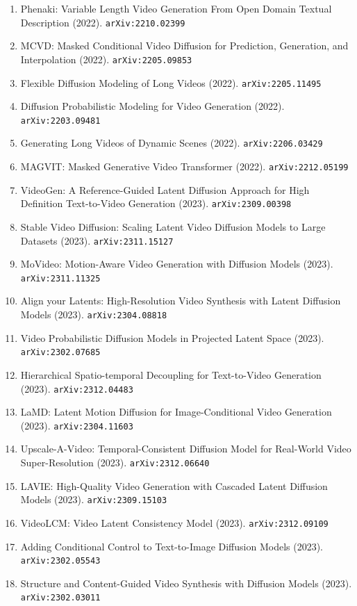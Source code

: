 \documentclass[11pt]{article}
\begin{document}
\begin{enumerate}
  Translation (2022). \texttt{arXiv:2211.12572}
  \item Phenaki: Variable Length Video Generation From Open Domain Textual
  Description (2022). \texttt{arXiv:2210.02399}
  \item MCVD: Masked Conditional Video Diffusion for Prediction, Generation, and
  Interpolation (2022). \texttt{arXiv:2205.09853}
  \item Flexible Diffusion Modeling of Long Videos (2022). \texttt{arXiv:2205.11495}
  \item Diffusion Probabilistic Modeling for Video Generation (2022). \texttt{arXiv:2203.09481}
  \item Generating Long Videos of Dynamic Scenes (2022). \texttt{arXiv:2206.03429}
  \item MAGVIT: Masked Generative Video Transformer (2022). \texttt{arXiv:2212.05199}
  \item VideoGen: A Reference-Guided Latent Diffusion Approach for High
  Definition Text-to-Video Generation (2023). \texttt{arXiv:2309.00398}
  \item Stable Video Diffusion: Scaling Latent Video Diffusion Models to Large
  Datasets (2023). \texttt{arXiv:2311.15127}
  \item MoVideo: Motion-Aware Video Generation with Diffusion Models (2023). \texttt{arXiv:2311.11325}
  \item Align your Latents: High-Resolution Video Synthesis with Latent
  Diffusion Models (2023). \texttt{arXiv:2304.08818}
  \item Video Probabilistic Diffusion Models in Projected Latent Space (2023). \texttt{arXiv:2302.07685}
  \item Hierarchical Spatio-temporal Decoupling for Text-to-Video Generation (2023). \texttt{arXiv:2312.04483}
  \item LaMD: Latent Motion Diffusion for Image-Conditional Video Generation (2023). \texttt{arXiv:2304.11603}
  \item Upscale-A-Video: Temporal-Consistent Diffusion Model for Real-World
  Video Super-Resolution (2023). \texttt{arXiv:2312.06640}
  \item LAVIE: High-Quality Video Generation with Cascaded Latent Diffusion
  Models (2023). \texttt{arXiv:2309.15103}
  \item VideoLCM: Video Latent Consistency Model (2023). \texttt{arXiv:2312.09109}
  \item Adding Conditional Control to Text-to-Image Diffusion Models (2023). \texttt{arXiv:2302.05543}
  \item Structure and Content-Guided Video Synthesis with Diffusion Models (2023). \texttt{arXiv:2302.03011}

\end{enumerate}
\end{document}
